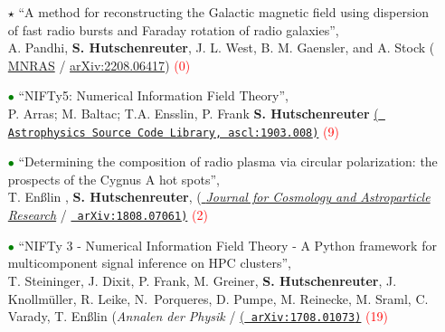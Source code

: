 \begin{itemize}
      \begin{itemize}
        \item[\textcolor{Black}{$\star$}]{``A method for reconstructing the Galactic magnetic field using dispersion of fast radio bursts and Faraday rotation of radio galaxies'', \\
        A. Pandhi, \textbf{S. Hutschenreuter}, J. L. West, B. M. Gaensler, and A. Stock ({\color{blue} \href{https://doi.org/10.1093/mnras/stac2314}{MNRAS} / \href{https://arxiv.org/abs/2208.06417}{arXiv:2208.06417}})
        \textcolor{red}{(0)}
        }

        \vspace{6pt}

        \item[\textcolor{Green}{$\bullet$}]{``NIFTy5: Numerical Information Field Theory'', \\P. Arras; M. Baltac; T.A. Ensslin, P. Frank \textbf{S. Hutschenreuter} \href{http://ascl.net/1903.008}{(\texttt{{\color{blue} Astrophysics Source Code Library, ascl:1903.008})}}
        \textcolor{red}{(9)}
        }

        \vspace{6pt}

        \item[\textcolor{Green}{$\bullet$}]{``Determining the composition of radio plasma via circular polarization: the prospects of the Cygnus A hot spots'', \\
        T. En{\ss}lin , \textbf{S. Hutschenreuter},  ({\color{blue}\href{https://iopscience.iop.org/article/10.1088/1475-7516/2019/01/035/meta}{ \textit{Journal for Cosmology and Astroparticle Research}} /
        \href{https://arxiv.org/abs/1808.07061}{\texttt{{\color{blue} arXiv:1808.07061})}}}
        \textcolor{red}{(2)}
        }

        \vspace{6pt}

        \item[\textcolor{Green}{$\bullet$}]{``NIFTy 3 - Numerical Information Field Theory - A Python framework for multicomponent signal inference on HPC clusters'', \\
        T. Steininger, J. Dixit, P. Frank, M. Greiner, \textbf{S. Hutschenreuter}, J. Knollm{\"u}ller, R. Leike, N.~Porqueres, D. Pumpe, M. Reinecke, M. Sraml, C. Varady, T. En{\ss}lin ({\color{blue}\textit{Annalen der Physik}} / \href{https://arxiv.org/abs/1708.01073}{(\texttt{{\color{blue} arXiv:1708.01073})}}
        \textcolor{red}{(19)}
        }


\end{itemize}
\end{itemize}
